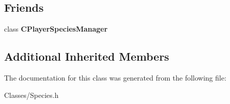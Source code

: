 \subsection*{Friends}
\begin{DoxyCompactItemize}
\item 
class {\bfseries C\+Player\+Species\+Manager}\hypertarget{class_c_player_species_a1f648829e43a62ea352129f6d9f96a7b}{}\label{class_c_player_species_a1f648829e43a62ea352129f6d9f96a7b}

\end{DoxyCompactItemize}
\subsection*{Additional Inherited Members}


The documentation for this class was generated from the following file\+:\begin{DoxyCompactItemize}
\item 
Classes/Species.\+h\end{DoxyCompactItemize}
